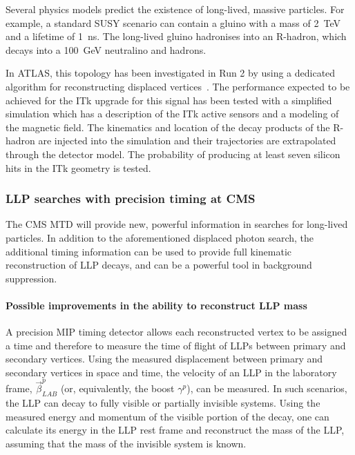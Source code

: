 Several physics models predict the existence of long-lived, massive particles. For example, a standard SUSY scenario can contain a gluino with a mass of 2~TeV and a lifetime of 1~ns. The long-lived gluino hadronises into an R-hadron, which decays into a 100~GeV neutralino and hadrons.

In ATLAS, this topology has been investigated in Run 2 by using a dedicated algorithm for reconstructing displaced vertices~\cite{ATL-PHYS-PUB-2017-014}. The performance expected to be achieved for the ITk upgrade for this signal has been tested with a simplified simulation which has a description of the ITk active sensors and a modeling of the magnetic field. The kinematics and location of the decay products of the R-hadron are injected into the simulation and their trajectories are extrapolated through the detector model. The probability of producing at least seven silicon hits in the ITk geometry is tested.


\subsubsection{LLP searches with precision timing at CMS}


The CMS MTD will provide new, powerful information in searches for long-lived particles. In addition to the aforementioned displaced photon search, the additional timing information can be used to provide full kinematic reconstruction of LLP decays, and can be a powerful tool in background suppression.

\paragraph{Possible improvements in the ability to reconstruct LLP mass}

A precision MIP timing detector allows each reconstructed vertex to be assigned a time and therefore to measure the time of flight of LLPs between primary and secondary vertices. Using the measured displacement between primary and secondary vertices in space and time, the velocity of an LLP in the laboratory frame, $\vec{\beta}_{LAB}^{p}$ (or, equivalently, the boost $\gamma^p$), can be measured. In such scenarios, the LLP can decay to fully visible or partially invisible systems. Using the measured energy and momentum of the visible portion of the decay, one can calculate its energy in the LLP rest frame and reconstruct the mass of the LLP, assuming that the mass of the invisible system is known.

